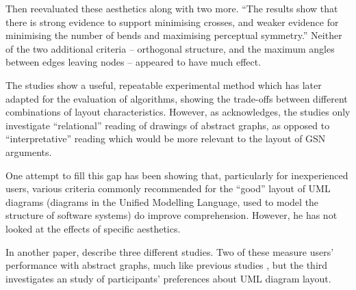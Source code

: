 Then \citet{Purchase1997which} reevaluated these aesthetics along with two more. ``The results show that there is strong
evidence to support minimising crosses, and weaker evidence for minimising the number of bends and maximising perceptual symmetry.''
Neither of the two additional criteria -- orthogonal structure, and the maximum angles between edges leaving nodes -- appeared to have much effect.

The studies show a useful, repeatable experimental method which \citet{PURCHASE1998647} has later adapted for the evaluation of algorithms, showing the trade-offs between different combinations of layout characteristics.
However, as \citet{Purchase1997which} acknowledges, the studies only investigate ``relational'' reading of drawings of abstract graphs, as opposed to ``interpretative'' reading which would be more relevant to the layout of GSN arguments.

One attempt to fill this gap has been \citet{storrle} showing that, particularly for inexperienced users, various criteria commonly recommended for the ``good'' layout of UML diagrams (diagrams in the Unified Modelling Language, used to model the structure of software systems) do improve comprehension. However, he has not looked at the effects of specific aesthetics.

In another paper, \citet{Purchase:2002:EEA:594512.594527} describe three different studies. Two of these measure users' performance with abstract graphs, much like previous studies \cite{Purchase1997basis, Purchase1997which, PURCHASE1998647}, but the third investigates an study of participants' preferences about UML diagram layout.

